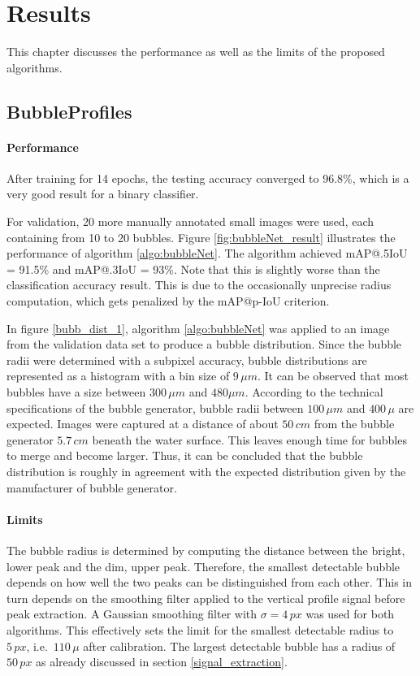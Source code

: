\chapter{Results}\label{results}
	This chapter discusses the performance as well as the limits of the proposed algorithms. 
	
		\section{BubbleProfiles}\label{result_profiles}
			
			\subsubsection{Performance}
			After training for 14 epochs, the testing accuracy converged to 96.8\%, which is a very good result for a binary classifier. 

			For validation, 20 more manually annotated small images were used, each containing from 10 to 20 bubbles. Figure \ref{fig:bubbleNet_result} illustrates the performance of algorithm \ref{algo:bubbleNet}.  
			The algorithm achieved mAP@.5IoU = 91.5\% and mAP@.3IoU = 93\%. Note that this is slightly worse than the classification accuracy result. This is due to the occasionally unprecise radius computation, which gets penalized by the mAP@p-IoU criterion. 
			
			In figure \ref{bubb_dist_1}, algorithm \ref{algo:bubbleNet} was applied to an image from the validation data set to produce a bubble distribution. Since the bubble radii were determined with a subpixel accuracy, bubble distributions are represented as a histogram with a bin size of $9 \, \mu m$. It can be observed that most bubbles have a size between $300 \, \mu m$ and $480 \mu m$. According to the technical specifications of the bubble generator, bubble radii between $100 \, \mu m$ and $400 \, \mu$ are expected. Images were captured at a distance of about $50 \, cm$ from the bubble generator $5.7 \, cm$ beneath the water surface. This leaves enough time for bubbles to merge and become larger. Thus, it can be concluded that the bubble distribution is roughly in agreement with the expected distribution given by the manufacturer of bubble generator.
			
			\subsubsection{Limits}
			The bubble radius is determined by computing the distance between the bright, lower peak and the dim, upper peak. Therefore, the smallest detectable bubble depends on how well the two peaks can be distinguished from each other.
			 This in turn depends on the smoothing filter applied to the vertical profile signal before peak extraction. A Gaussian smoothing filter with $\sigma = 4 \, px$ was used for both algorithms. This effectively sets the limit for the smallest detectable radius to $5 \, px$, i.e.\ $110 \, \mu$ after calibration. The largest detectable bubble has a radius of $50 \, px$ as already discussed in section \ref{signal_extraction}. 
			 
